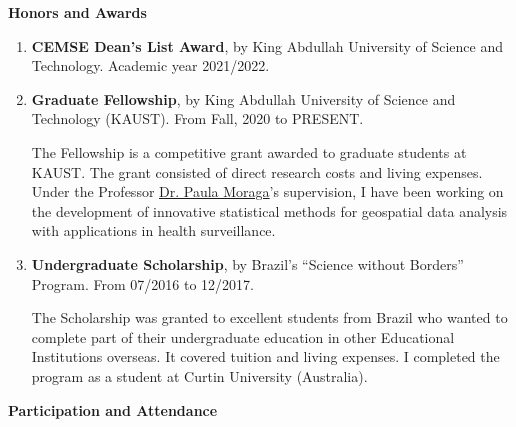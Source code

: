 \documentclass[11pt, ]{article}
\begin{document}
	\vspace{6pt}
	
	{\Large \textbf{Honors and Awards}}
	
	\begin{enumerate}
		\item \textbf{CEMSE Dean's List Award}, by King Abdullah University of Science and Technology. Academic year 2021/2022.
		
		\item \textbf{Graduate Fellowship}, by King Abdullah University of Science and Technology (KAUST). From Fall, 2020 to PRESENT.
		
		The Fellowship is a competitive grant awarded to graduate students at KAUST. The grant consisted of direct research costs and living expenses. Under the Professor \href{https://www.paulamoraga.com/}{Dr. Paula Moraga}'s supervision, I have been working on the development of innovative statistical methods for geospatial data analysis with applications in health surveillance.
		
		\item \textbf{Undergraduate Scholarship}, by Brazil's ``Science without Borders'' Program. From 07/2016 to 12/2017.
		
		The Scholarship was granted to excellent students from Brazil who wanted to complete part of their undergraduate education in other Educational Institutions overseas. It covered tuition and living expenses. I completed the program as a student at Curtin University (Australia).
		
	\end{enumerate}
	
	\vspace{6pt}
	
	{\Large \textbf{Participation and Attendance}}
	
\end{document}
